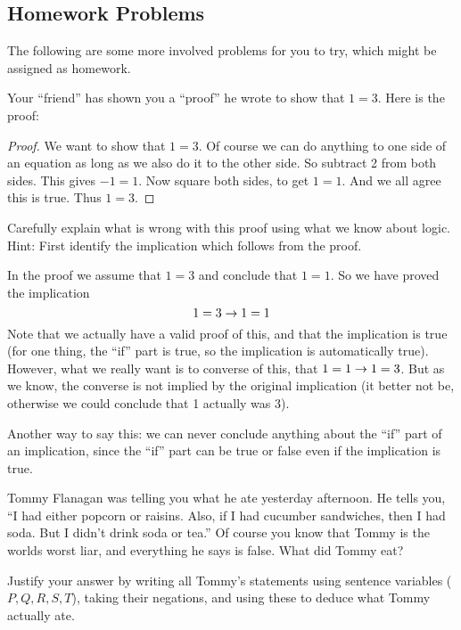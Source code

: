 

\subsection*{Homework Problems}

The following are some more involved problems for you to try, which might be assigned as homework.

\begin{questions}

\question Your ``friend'' has shown you a ``proof'' he wrote to show that $1 = 3$.  Here is the proof:

\begin{proof}
We want to show that $1 = 3$.  Of course we can do anything to one side of an equation as long as we also do it to the other side.  So subtract 2 from both sides.  This gives $-1 = 1$.  Now square both sides, to get $1 = 1$.  And we all agree this is true. Thus $1=3$.
\end{proof}

Carefully explain what is wrong with this proof using what we know about logic.  Hint: First identify the implication which follows from the proof.

\begin{solution}
In the proof we assume that $1=3$ and conclude that $1=1$.  So we have proved the implication
\[1=3 \rightarrow 1=1\]
Note that we actually have a valid proof of this, and that the implication is true (for one thing, the ``if'' part is true, so the implication is automatically true).  However, what we really want is to converse of this, that $1=1 \rightarrow 1=3$.  But as we know, the converse is not implied by the original implication (it better not be, otherwise we could conclude that 1 actually was 3).  

Another way to say this: we can never conclude anything about the ``if'' part of an implication, since the ``if'' part can be true or false even if the implication is true.
\end{solution}



\question Tommy Flanagan was telling you what he ate yesterday afternoon.  He tells you, ``I had either popcorn or raisins.  Also, if I had cucumber sandwiches, then I had soda.  But I didn't drink soda or tea.''  Of course you know that Tommy is the worlds worst liar, and everything he says is false.  What did Tommy eat?  

Justify your answer by writing all Tommy's statements using sentence variables ($P, Q, R, S, T$), taking their negations, and using these to deduce what Tommy actually ate.


\end{questions}

